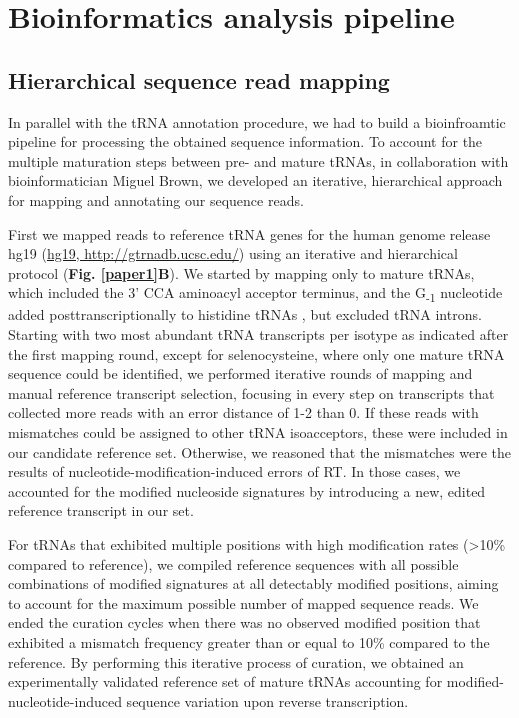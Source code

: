 \documentclass[12pt]{rockefeller}
\newcommand{\sub}[1]{\textsubscript{#1}}
\begin{document}
\section{Bioinformatics analysis pipeline}
\subsection{Hierarchical sequence read mapping}
In parallel with the tRNA annotation procedure, we had to build a bioinfroamtic pipeline for processing the obtained sequence information. To account for the multiple maturation steps between pre- and mature tRNAs, in collaboration with bioinformatician Miguel Brown, we developed an iterative, hierarchical approach for mapping and annotating our sequence reads. 

First we mapped reads to reference tRNA genes for the human genome release hg19 (\url{hg19, http://gtrnadb.ucsc.edu/}) using an iterative and hierarchical protocol (\textbf{Fig. \ref{paper1}B}). We started by mapping only to mature tRNAs, which included the 3’ CCA aminoacyl acceptor terminus, and the G\sub{-1} nucleotide added posttranscriptionally to histidine tRNAs \cite{Gu:2003jj, Juhling:2009ip}, but excluded tRNA introns. Starting with two most abundant tRNA transcripts per \gls{isotype}  as indicated after the first mapping round, except for selenocysteine, where only one mature tRNA sequence could be identified, we performed iterative rounds of mapping and manual reference transcript selection, focusing in every step on transcripts that collected more reads with an error distance of 1-2 than 0. If these reads with mismatches could be assigned to other tRNA isoacceptors, these were included in our candidate reference set. Otherwise, we reasoned that the mismatches were the results of nucleotide-modification-induced errors of RT. In those cases, we accounted for the modified nucleoside signatures by introducing a new, edited reference transcript in our set. 

For tRNAs that exhibited multiple positions with high modification rates (>10\% compared to reference), we compiled reference sequences with all possible combinations of modified signatures at all detectably modified positions, aiming to account for the maximum possible number of mapped sequence reads. We ended the curation cycles when there was no observed modified position that exhibited a mismatch frequency greater than or equal to 10\% compared to the reference. By performing this iterative process of curation, we obtained an experimentally validated reference set of mature tRNAs accounting for modified-nucleotide-induced sequence variation upon reverse transcription.
\end{document}
